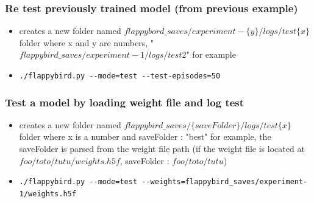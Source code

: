 \documentclass[a4paper,10pt,openany,oneside]{report}
\begin{document}
\subsubsection*{Re test previously trained model (from previous example)}
\begin{itemize}
\item creates a new folder named $flappybord\_saves/experiment-\{y\}/logs/test\{x\}$ folder where x and y are numbers, "$flappybird\_saves/experiment-1/logs/test2$" for example
\item \lstinline{./flappybird.py --mode=test --test-episodes=50}
\end{itemize}
\subsubsection*{Test a model by loading weight file and log test}
\begin{itemize}
	\item creates a new folder named $flappybird\_saves/\{saveFolder\}/logs/test\{x\}$ folder where x is a number and saveFolder : "best" for example, the saveFolder is parsed from the weight file path (if the weight file is located at $foo/toto/tutu/weights.h5f$, saveFolder : $foo/toto/tutu$)
	\item \lstinline{./flappybird.py --mode=test --weights=flappybird_saves/experiment-1/weights.h5f}
\end{itemize}
\end{document}
